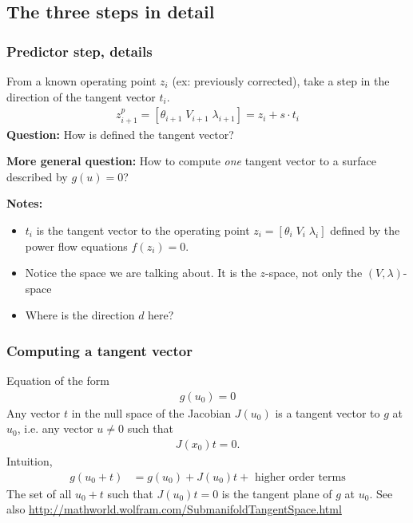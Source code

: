\documentclass{beamer}
\begin{document}
\subsection{The three steps in detail}

\begin{frame}
  \frametitle{Predictor step, details}
  From a known operating point $z_i$ (ex: previously corrected), take a step in the direction of the tangent vector $t_{i}$.
  \begin{align}
  z_{i+1}^p = [\theta_{i+1} \; V_{i+1} \; \lambda_{i+1} ]= z_{i} + s \cdot t_{i}  
  \end{align}
\textbf{Question:} How is defined the tangent vector?


\textbf{More general question:} How to compute \emph{one} tangent vector to a surface described by $g(u) = 0$?

\textbf{Notes:}
\begin{itemize}
\item $t_{i}$ is the tangent vector to the operating point $z_i = [\theta_i \; V_i \; \lambda_i]$ defined by the power flow equations $f(z_i) = 0$. 
\item Notice the space we are talking about. It is the $z$-space, not only the $(V,\lambda)$-space
\item Where is the direction $d$ here?
\end{itemize}
\end{frame}

\begin{frame}
  \frametitle{Computing a tangent vector}
  Equation of the form 
  \begin{align}
    \label{eq:4}
    g(u_0) = 0
  \end{align}
Any vector $t$ in the null space of the Jacobian $J(u_0)$ is a tangent vector to $g$ at $u_0$, i.e. any vector $u\neq 0$ such that
\begin{align}
  \label{eq:5}
  J(x_0) t = 0.
\end{align}
Intuition,
\begin{align}
  \label{eq:6}
  g(u_0+t) &= g(u_0) + J(u_0) t + \text{ higher order terms}
\end{align}
The set of all $u_0+t$ such that $J(u_0) t = 0$ is the tangent plane of $g$ at $u_0$.
\vskip0.5cm
\footnotesize See also \url{http://mathworld.wolfram.com/SubmanifoldTangentSpace.html}
\end{frame}
\end{document}
